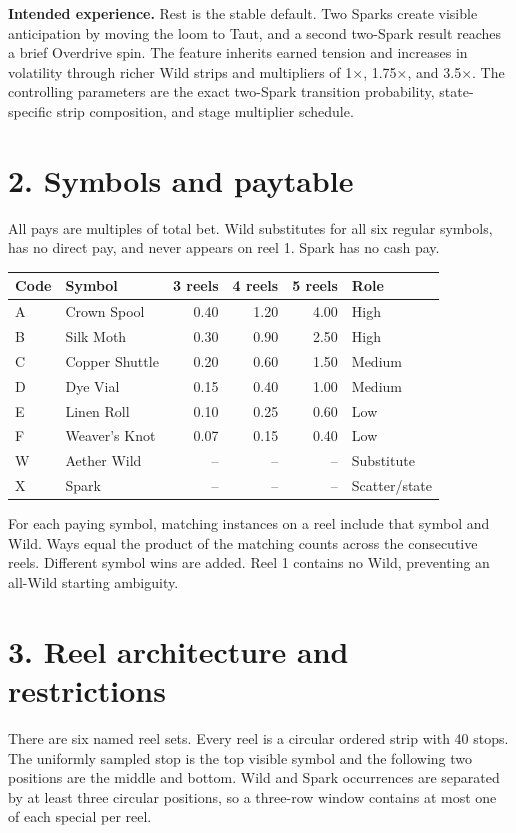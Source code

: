 \documentclass[10pt]{article}
\newcommand{\sectionbar}[1]{\vspace{8pt}{\color{acid}\rule{\linewidth}{1.5pt}}\vspace{-5pt}\section*{#1}}
\begin{document}
\textbf{Intended experience.} Rest is the stable default. Two Sparks create visible anticipation by moving the loom to Taut, and a second two-Spark result reaches a brief Overdrive spin. The feature inherits earned tension and increases in volatility through richer Wild strips and multipliers of 1×, 1.75×, and 3.5×. The controlling parameters are the exact two-Spark transition probability, state-specific strip composition, and stage multiplier schedule.

\sectionbar{2. Symbols and paytable}
All pays are multiples of total bet. Wild substitutes for all six regular symbols, has no direct pay, and never appears on reel 1. Spark has no cash pay.

\begin{center}\begin{tabular}{l l r r r l}
\hline
Code & Symbol & 3 reels & 4 reels & 5 reels & Role\\\hline
A & Crown Spool & 0.40 & 1.20 & 4.00 & High\\
B & Silk Moth & 0.30 & 0.90 & 2.50 & High\\
C & Copper Shuttle & 0.20 & 0.60 & 1.50 & Medium\\
D & Dye Vial & 0.15 & 0.40 & 1.00 & Medium\\
E & Linen Roll & 0.10 & 0.25 & 0.60 & Low\\
F & Weaver's Knot & 0.07 & 0.15 & 0.40 & Low\\
W & Aether Wild & -- & -- & -- & Substitute\\
X & Spark & -- & -- & -- & Scatter/state\\\hline
\end{tabular}\end{center}

For each paying symbol, matching instances on a reel include that symbol and Wild. Ways equal the product of the matching counts across the consecutive reels. Different symbol wins are added. Reel 1 contains no Wild, preventing an all-Wild starting ambiguity.

\sectionbar{3. Reel architecture and restrictions}
There are six named reel sets. Every reel is a circular ordered strip with 40 stops. The uniformly sampled stop is the top visible symbol and the following two positions are the middle and bottom. Wild and Spark occurrences are separated by at least three circular positions, so a three-row window contains at most one of each special per reel.
\end{document}
